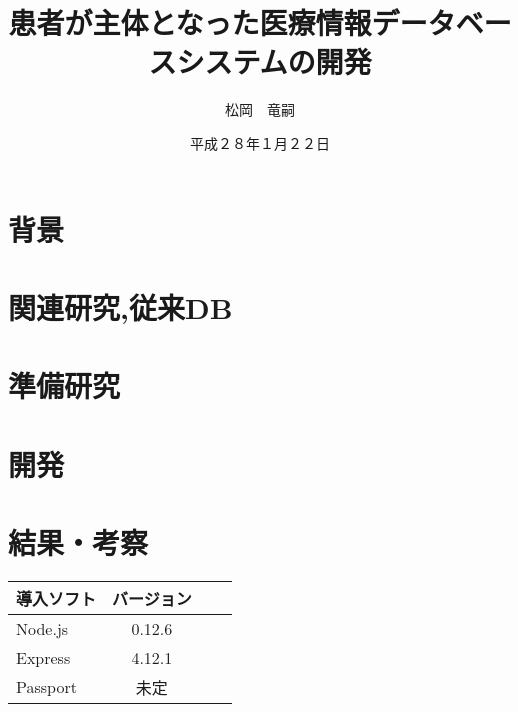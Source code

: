 \documentclass[12pt]{sotsuron}
\title{患者が主体となった医療情報データベースシステムの開発}
\author{松岡　竜嗣}
\date{平成２８年１月２２日}
\affiliation{電子機械工学専攻}
\begin{document}
\maketitle

\begin{abstract}


\end{abstract}

\tableofcontents
\clearpage


\section{背景}


\section{関連研究,従来DB}


\section{準備研究}


\section{開発}


\section{結果・考察}






\appendix

\begin{table}[htb]
	\begin{tabular}{|l|c|r|r|}\hline
	導入ソフト & バージョン \\ \hline \hline
	Node.js & 0.12.6 \\ \hline
	Express & 4.12.1 \\ \hline
	Passport & 未定 \\ \hline
	\end{tabular}
\end{table}


%
\end{document}
